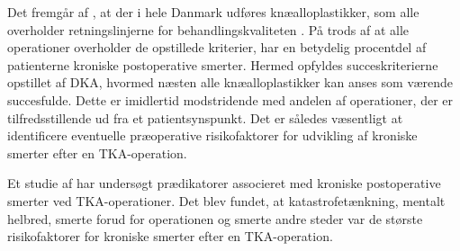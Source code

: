 Det fremgår af , at der i hele Danmark udføres knæalloplastikker, som alle overholder retningslinjerne for behandlingskvaliteten \citep{aarsrapport2016}. 
På trods af at alle operationer overholder de opstillede kriterier, har en betydelig procentdel af patienterne kroniske postoperative smerter. \citep{Bourne2010} Hermed opfyldes succeskriterierne opstillet af DKA, hvormed næsten alle knæalloplastikker kan anses som værende succesfulde. Dette er imidlertid modstridende med andelen af operationer, der er tilfredsstillende ud fra et patientsynspunkt. Det er således væsentligt at identificere eventuelle præoperative risikofaktorer for udvikling af kroniske smerter efter en TKA-operation.  

Et studie af  har undersøgt prædikatorer associeret med kroniske postoperative smerter ved TKA-operationer. Det blev fundet, at katastrofetænkning, mentalt helbred, smerte forud for operationen og smerte andre steder var de største risikofaktorer for kroniske smerter efter en TKA-operation. 

